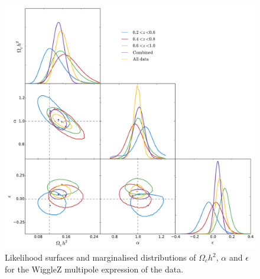 \documentclass[iop,twocolappendix]{emulateapj}
\begin{document}
\begin{figure}
	\begin{center}
		\includegraphics[width=\columnwidth]{images/corCombinedMPWig.pdf}
	\end{center}
	\caption{Likelihood surfaces and marginalised distributions of $\Omega_ch^2$, $\alpha$ and $\epsilon$ for the WiggleZ multipole expression of the data. }
	\label{fig:wigglezBinsMP}
\end{figure}





\end{document}
